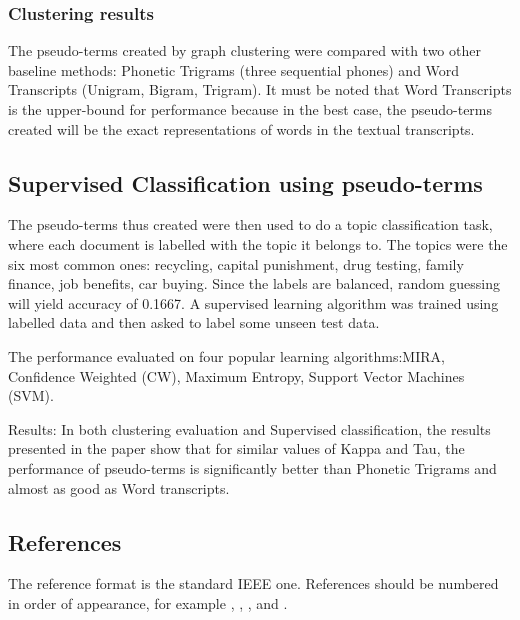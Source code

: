 \documentclass[a4paper]{article}
\begin{document}
\subsubsection{Clustering results}
The pseudo-terms created by graph clustering were compared with two other baseline methods: Phonetic Trigrams (three sequential phones) and Word Transcripts (Unigram, Bigram, Trigram). It must be noted that Word Transcripts is the upper-bound for performance because in the best case, the pseudo-terms created will be the exact representations of words in the textual transcripts.

\subsection{Supervised Classification using pseudo-terms}
The pseudo-terms thus created were then used to do a topic classification task, where each document is labelled with the topic it belongs to. The topics were the six most common ones: recycling, capital punishment, drug testing, family finance, job benefits, car buying. Since the labels are balanced, random guessing will yield accuracy of 0.1667. A supervised learning algorithm was trained using labelled data and then asked to label some unseen test data.

The performance evaluated on four popular learning algorithms:MIRA, Confidence Weighted (CW), Maximum Entropy, Support Vector Machines (SVM).

Results:
In both clustering evaluation and Supervised classification, the results presented in the paper show that for similar values of Kappa and Tau, the performance of pseudo-terms is significantly better than Phonetic Trigrams and almost as good as Word transcripts.




\subsection{References}

The reference format is the standard IEEE one. References should be numbered in order of appearance, for example \cite{Davis80-COP}, \cite{Rabiner89-ATO}, \cite[pp.\ 417--422]{Hastie09-TEO}, and \cite{YourName17-XXX}.
\end{document}
